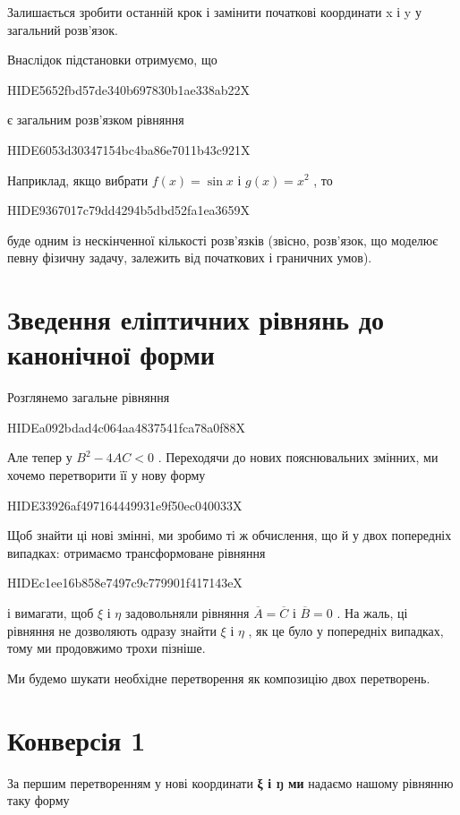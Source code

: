\documentclass[
  ukrainian,
]{article}
\begin{document}
Залишається зробити останній крок і замінити початкові координати x і y
у загальний розв'язок.

Внаслідок підстановки отримуємо, що

HIDE5652fbd57de340b697830b1ae338ab22X

є загальним розв'язком рівняння

HIDE6053d30347154bc4ba86e7011b43c921X

Наприклад, якщо вибрати \(f(x) = \sin x\) і \(g(x) = x^2\) , то

HIDE9367017c79dd4294b5dbd52fa1ea3659X

буде одним із нескінченної кількості розв'язків (звісно, розв'язок, що
моделює певну фізичну задачу, залежить від початкових і граничних умов).

\section{Зведення еліптичних рівнянь до канонічної
форми}\label{ux437ux432ux435ux434ux435ux43dux43dux44f-ux435ux43bux456ux43fux442ux438ux447ux43dux438ux445-ux440ux456ux432ux43dux44fux43dux44c-ux434ux43e-ux43aux430ux43dux43eux43dux456ux447ux43dux43eux457-ux444ux43eux440ux43cux438-1}

Розглянемо загальне рівняння

HIDEa092bdad4c064aa4837541fca78a0f88X

Але тепер у \(B^2-4AC<0\) . Переходячи до нових пояснювальних змінних,
ми хочемо перетворити її у нову форму

HIDE33926af497164449931e9f50ec040033X

Щоб знайти ці нові змінні, ми зробимо ті ж обчислення, що й у двох
попередніх випадках: отримаємо трансформоване рівняння

HIDEc1ee16b858e7497c9c779901f417143eX

і вимагати, щоб \(\xi\) і \(\eta\) задовольняли рівняння
\(\overline{A}=\overline{C}\) і \(\overline{B}=0\) . На жаль, ці
рівняння не дозволяють одразу знайти \(\xi\) і \(\eta\) , як це було у
попередніх випадках, тому ми продовжимо трохи пізніше.

Ми будемо шукати необхідне перетворення як композицію двох перетворень.

\section{Конверсія
1}\label{ux43aux43eux43dux432ux435ux440ux441ux456ux44f-1-1}

За першим перетворенням у нові координати \textbf{ξ і ŋ ми} надаємо
нашому рівнянню таку форму
\end{document}
